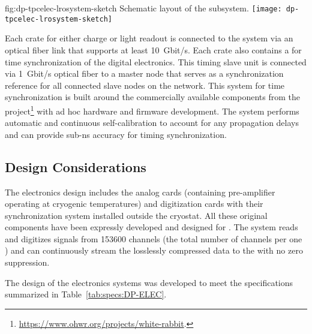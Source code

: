 \begin{dunefigure}{fig:dp-tpcelec-lrosystem-sketch}
{Schematic layout of the   subsystem.}
\texttt{[image: dp-tpcelec-lrosystem-sketch]}
\end{dunefigure}

Each  crate for either charge or light readout is connected to the  system via an optical fiber link that supports at least \SI{10}{Gbit/s}. Each crate also contains a  for time synchronization of the digital electronics. This timing slave unit is connected via \SI{1}{Gbit/s} optical fiber to a master node that serves as a synchronization reference for all connected slave nodes on the network. This system for time synchronization is built around the commercially available components from the  project\footnote{\url{https://www.ohwr.org/projects/white-rabbit}.} with ad hoc hardware and firmware development. The system performs automatic and continuous self-calibration to account for any propagation delays and can provide sub-\si{\nano\s} accuracy for timing synchronization.



\subsection{Design Considerations}
\label{ssec:dp-tpcelec-requir}


The  electronics design includes the analog  cards (containing pre-amplifier  operating at cryogenic temperatures) and digitization cards with their synchronization system installed outside the cryostat. All these original components have been expressly developed and designed for . The system reads and digitizes signals from \num{153600} channels (the total number of  channels per one ) and can continuously stream the losslessly compressed data to the  with no zero suppression. 

The design of the electronics systems was developed to meet the specifications summarized in Table~\ref{tab:specs:DP-ELEC}.



